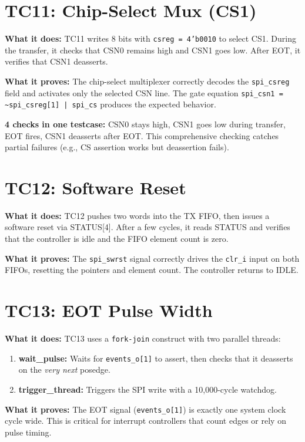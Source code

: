 \section{TC11: Chip-Select Mux (CS1)}

\textbf{What it does:} TC11 writes 8 bits with \texttt{csreg = 4'b0010} to select CS1. During
the transfer, it checks that CSN0 remains high and CSN1 goes low. After EOT, it verifies that
CSN1 deasserts.

\textbf{What it proves:} The chip-select multiplexer correctly decodes the \texttt{spi\_csreg}
field and activates only the selected CSN line. The gate equation
\texttt{spi\_csn1 = \textasciitilde spi\_csreg[1] | spi\_cs} produces the expected behavior.

\textbf{4 checks in one testcase:} CSN0 stays high, CSN1 goes low during transfer, EOT fires,
CSN1 deasserts after EOT. This comprehensive checking catches partial failures (e.g., CS
assertion works but deassertion fails).

\section{TC12: Software Reset}

\textbf{What it does:} TC12 pushes two words into the TX FIFO, then issues a software reset via
STATUS[4]. After a few cycles, it reads STATUS and verifies that the controller is idle and the
FIFO element count is zero.

\textbf{What it proves:} The \texttt{spi\_swrst} signal correctly drives the \texttt{clr\_i}
input on both FIFOs, resetting the pointers and element count. The controller returns to IDLE.

\section{TC13: EOT Pulse Width}
\label{sec:tc13}

\textbf{What it does:} TC13 uses a \texttt{fork-join} construct with two parallel threads:
\begin{enumerate}[leftmargin=2em]
  \item \textbf{wait\_pulse:} Waits for \texttt{events\_o[1]} to assert, then checks that it
        deasserts on the \emph{very next} posedge.
  \item \textbf{trigger\_thread:} Triggers the SPI write with a 10,000-cycle watchdog.
\end{enumerate}

\textbf{What it proves:} The EOT signal (\texttt{events\_o[1]}) is exactly one system clock cycle
wide. This is critical for interrupt controllers that count edges or rely on pulse timing.

